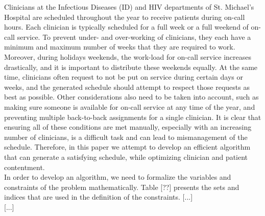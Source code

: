 Clinicians at the Infectious Diseases (ID) and HIV departments of St. Michael's Hospital are scheduled throughout the year to receive patients during on-call hours. Each clinician is typically scheduled for a full week or a full weekend of on-call service. To prevent under- and over-working of clinicians, they each have a minimum and maximum number of weeks that they are required to work. Moreover, during holidays weekends, the work-load for on-call service increases drastically, and it is important to distribute these weekends equally. At the same time, clinicians often request to not be put on service during certain days or weeks, and the generated schedule should attempt to respect those requests as best as possible. Other considerations also need to be taken into account, such as making sure someone is available for on-call service at any time of the year, and preventing multiple back-to-back assignments for a single clinician. It is clear that ensuring all of these conditions are met manually, especially with an increasing number of clinicians, is a difficult task and can lead to mismanagement of the schedule. Therefore, in this paper we attempt to develop an efficient algorithm that can generate a satisfying schedule, while optimizing clinician and patient contentment. \\

In order to develop an algorithm, we need to formalize the variables and constraints of the problem mathematically. Table [??] presents the sets and indices that are used in the definition of the constraints. [...] \\

[...]